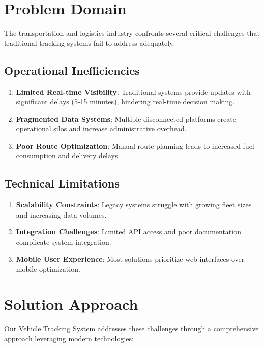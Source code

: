 \section{Problem Domain}
\label{sec:problem_domain}

The transportation and logistics industry confronts several critical challenges that traditional tracking systems fail to address adequately:

\subsection{Operational Inefficiencies}
\begin{enumerate}
    \item \textbf{Limited Real-time Visibility}: Traditional systems provide updates with significant delays (5-15 minutes), hindering real-time decision making.
    \item \textbf{Fragmented Data Systems}: Multiple disconnected platforms create operational silos and increase administrative overhead.
    \item \textbf{Poor Route Optimization}: Manual route planning leads to increased fuel consumption and delivery delays.
\end{enumerate}

\subsection{Technical Limitations}
\begin{enumerate}
    \item \textbf{Scalability Constraints}: Legacy systems struggle with growing fleet sizes and increasing data volumes.
    \item \textbf{Integration Challenges}: Limited API access and poor documentation complicate system integration.
    \item \textbf{Mobile User Experience}: Most solutions prioritize web interfaces over mobile optimization.
\end{enumerate}

\section{Solution Approach}
\label{sec:solution_approach}

Our Vehicle Tracking System addresses these challenges through a comprehensive approach leveraging modern technologies:

